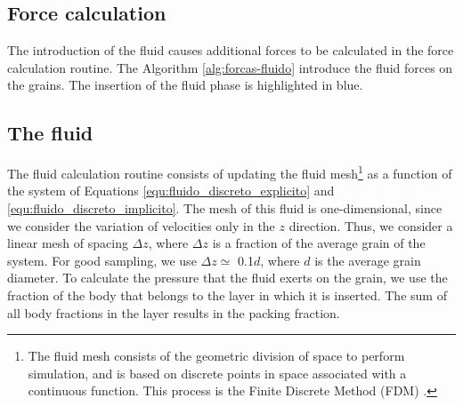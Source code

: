 

\subsection{Force calculation}
    The introduction of the fluid causes additional forces to be calculated in the force calculation routine. The Algorithm \ref{alg:forcas-fluido} introduce the fluid forces on the grains. The insertion of the fluid phase is highlighted in blue.



\subsection{The fluid}
    The fluid calculation routine consists of updating the fluid mesh\footnote{The fluid mesh consists of the geometric division of space to perform simulation, and is based on discrete points in space associated with a continuous function. This process is the Finite Discrete Method (FDM) \cite{Numerical_Heat_Transfer_and_Fluid_Flow}.} as a function of the system of Equations \ref{equ:fluido_discreto_explicito} and \ref{equ:fluido_discreto_implicito}. The mesh of this fluid is one-dimensional, since we consider the variation of velocities only in the $z$ direction. Thus, we consider a linear mesh of spacing $\Delta z$, where $\Delta z$ is a fraction of the average grain of the system. For good sampling, we use $\Delta z \simeq$ 0.1$d$, where $d$ is the average grain diameter. To calculate the pressure that the fluid exerts on the grain, we use the fraction of the body that belongs to the layer in which it is inserted. The sum of all body fractions in the layer results in the packing fraction.

